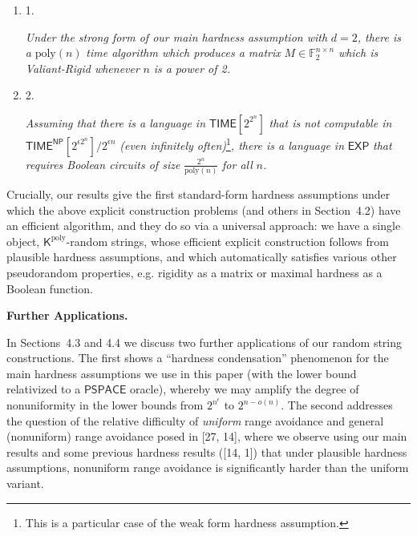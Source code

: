 \begin{enumerate}


\item[] 
1. 


\emph{Under the strong form of our main hardness assumption with }$d=2$\emph{, there is a }$\mathrm{poly}(n)$\emph{ time algorithm which produces a matrix }$M\in\mathbb{F}_{2}^{n\times n}$\emph{ which is Valiant-Rigid whenever }$n$\emph{ is a power of 2.}\par





\item[] 
2. 


\emph{Assuming that there is a language in }${\mathsf{TIME}}[2^{2^{n}}]$\emph{ that is not computable in }${\mathsf{TIME}}^{\mathsf{NP}}[2^{\epsilon 2^{n}}]/2^{\epsilon n}$\emph{ (even infinitely often)}\footnote{This is a particular case of the weak form hardness assumption.}\emph{, there is a language in }${\mathsf{EXP}}$\emph{ that requires Boolean circuits of size }$\frac{2^{n}}{\mathrm{poly}(n)}$\emph{ for all }$n$\emph{.}\par





\end{enumerate}






Crucially, our results give the first standard-form hardness assumptions under which the above explicit construction problems (and others in Section 4.2) have an efficient algorithm, and they do so via a universal approach: we have a single object, ${\mathsf{K}}^{\mathrm{poly}}$-random strings, whose efficient explicit construction follows from plausible hardness assumptions, and which automatically satisfies various other pseudorandom properties, e.g. rigidity as a matrix or maximal hardness as a Boolean function.\par





\par\medskip\noindent\textbf{Further Applications.}\par




In Sections 4.3 and 4.4 we discuss two further applications of our random string constructions. The first shows a “hardness condensation” phenomenon for the main hardness assumptions we use in this paper (with the lower bound relativized to a $\mathsf{PSPACE}$ oracle), whereby we may amplify the degree of nonuniformity in the lower bounds from $2^{n^{\epsilon}}$ to $2^{n-o(n)}$.
The second addresses the question of the relative difficulty of \emph{uniform} range avoidance and general (nonuniform) range avoidance posed in [27, 14], where we observe using our main results and some previous hardness results ([14, 1]) that under plausible hardness assumptions, nonuniform range avoidance is significantly harder than the uniform variant.\par






